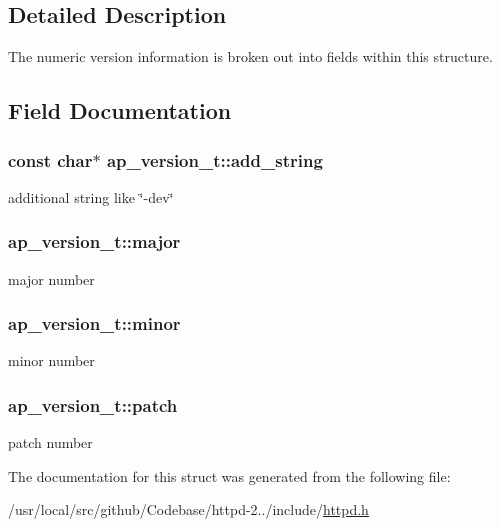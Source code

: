 \subsection{Detailed Description}
The numeric version information is broken out into fields within this structure. 

\subsection{Field Documentation}
\subsubsection[{\texorpdfstring{add\+\_\+string}{add_string}}]{\setlength{\rightskip}{0pt plus 5cm}const char$\ast$ ap\+\_\+version\+\_\+t\+::add\+\_\+string}\hypertarget{structap__version__t_a8ad8a44c692da3a3e2486339316e067e}{}\label{structap__version__t_a8ad8a44c692da3a3e2486339316e067e}
additional string like \char`\"{}-\/dev\char`\"{} 
\subsubsection[{\texorpdfstring{major}{major}}]{ ap\+\_\+version\+\_\+t\+::major}\hypertarget{structap__version__t_a683c7fbfbe7d2acc4d1e98447e5dfcce}{}\label{structap__version__t_a683c7fbfbe7d2acc4d1e98447e5dfcce}
major number 
\subsubsection[{\texorpdfstring{minor}{minor}}]{ ap\+\_\+version\+\_\+t\+::minor}\hypertarget{structap__version__t_a1fef6241aa800d1e2ab21a226d6ea63d}{}\label{structap__version__t_a1fef6241aa800d1e2ab21a226d6ea63d}
minor number 
\subsubsection[{\texorpdfstring{patch}{patch}}]{ ap\+\_\+version\+\_\+t\+::patch}\hypertarget{structap__version__t_a1363a336b522aba0cce3ad63239343b3}{}\label{structap__version__t_a1363a336b522aba0cce3ad63239343b3}
patch number 

The documentation for this struct was generated from the following file\+:\begin{DoxyCompactItemize}
\item 
/usr/local/src/github/\+Codebase/httpd-\/2../include/\hyperlink{httpd_8h}{httpd.\+h}\end{DoxyCompactItemize}
